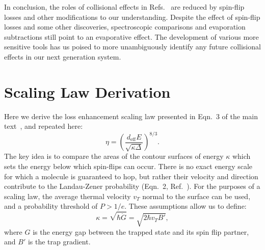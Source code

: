 \documentclass[%
 reprint,
 amsmath,amssymb,
 aps,
pra,
]{revtex4-1}
\begin{document}

In conclusion, the roles of collisional effects in Refs.~\cite{Stuhl2013,Stuhl2012evap} are reduced by spin-flip losses and other modifications to our understanding.
Despite the effect of spin-flip losses and some other discoveries, spectroscopic comparisons and evaporation subtractions still point to an evaporative effect. 
The development of various more sensitive tools has us poised to more unambiguously identify any future collisional effects in our next generation system.

\section{Scaling Law Derivation}

Here we derive the loss enhancement scaling law presented in Eqn.~3 of the main text~\cite{smt}, and repeated here:
\begin{equation}
\eta= \left(\frac{d_\text{eff}E}{\sqrt{\kappa\Delta}}\right)^{8/3}.
\end{equation}
The key idea is to compare the areas of the contour surfaces of energy $\kappa$ which sets the energy below which spin-flips can occur.
There is no exact energy scale for which a molecule is guaranteed to hop, but rather their velocity and direction contribute to the Landau-Zener probability (Eqn.~2, Ref.~\cite{smt}).
For the purposes of a scaling law, the average thermal velocity $v_T$ normal to the surface can be used, and a probability threshold of $P>1/e$.
These assumptions allow us to define: 
\begin{equation}
\kappa=\sqrt{\hbar\dot{G}}=\sqrt{2\hbar v_T B'},
\end{equation} 
where $G$ is the energy gap between the trapped state and its spin flip partner, and $B'$ is the trap gradient.
\end{document}

